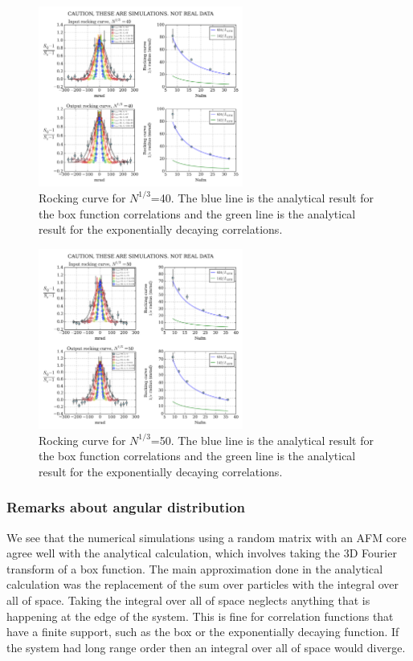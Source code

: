 \documentclass[11pt,letter]{article}
\begin{document}
\begin{figure}
\centering \includegraphics[width=0.6\textwidth]{figures_140308/Rocking_40.png}
\caption[Rocking curve for $N^{1/3}$=40]{\small Rocking curve for $N^{1/3}$=40.
The blue line is the analytical result for the box function correlations and
the green line is the analytical result for the exponentially decaying
correlations.  }
\label{fig:rocking40}
\end{figure}
\begin{figure}[h]
\centering \includegraphics[width=0.6\textwidth]{figures_140308/Rocking_50.png}
\caption[Rocking curve for $N^{1/3}$=50]{\small Rocking curve for $N^{1/3}$=50.
The blue line is the analytical result for the box function correlations and
the green line is the analytical result for the exponentially decaying
correlations.  }
\label{fig:rocking50}
\end{figure}

\subsubsection{Remarks about angular distribution}

We see that the numerical simulations using a random matrix with an AFM core
agree well  with the analytical calculation, which involves taking the 3D
Fourier transform of a box function.  The main approximation done in the
analytical calculation was the replacement of the sum over particles with the
integral over all of space.  Taking the integral over all of space neglects
anything that is happening at the edge of the system.   This is fine for
correlation functions that have a finite support, such as the box or the
exponentially decaying function.   If the system had long range order then an
integral over all of space would diverge. 
\end{document}
